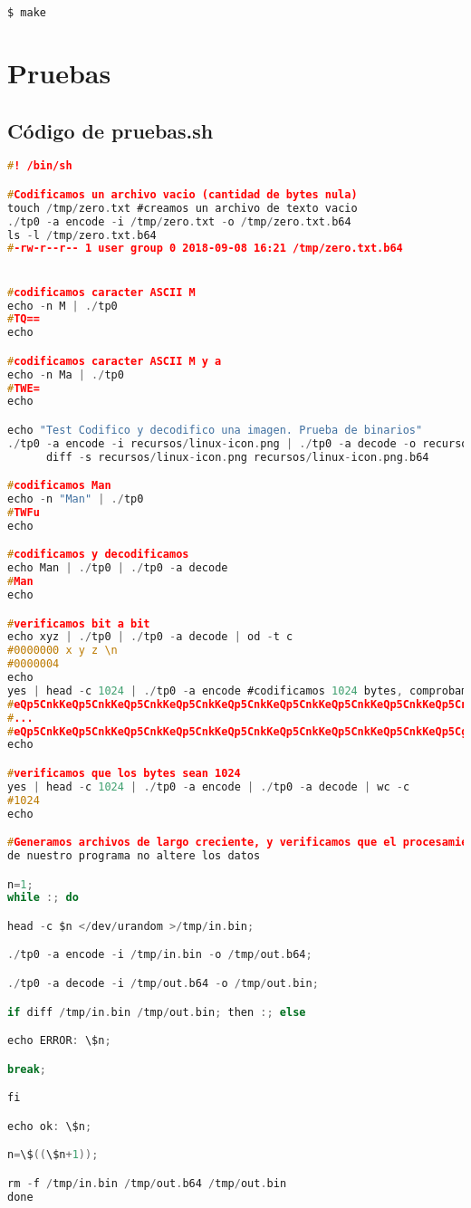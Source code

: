 \documentclass[a4paper,11pt, margin=1in]{article}
\begin{document}
\begin{lstlisting}[language=bash,frame=\tiny]
$ make
\end{lstlisting}

\section{Pruebas}
\subsection{Código de pruebas.sh}
\begin{lstlisting}[language=c,breaklines=true]
#! /bin/sh

#Codificamos un archivo vacio (cantidad de bytes nula)
touch /tmp/zero.txt #creamos un archivo de texto vacio
./tp0 -a encode -i /tmp/zero.txt -o /tmp/zero.txt.b64
ls -l /tmp/zero.txt.b64
#-rw-r--r-- 1 user group 0 2018-09-08 16:21 /tmp/zero.txt.b64


#codificamos caracter ASCII M
echo -n M | ./tp0 
#TQ==
echo

#codificamos caracter ASCII M y a
echo -n Ma | ./tp0 
#TWE=
echo

echo "Test Codifico y decodifico una imagen. Prueba de binarios"
./tp0 -a encode -i recursos/linux-icon.png | ./tp0 -a decode -o recursos/linux-icon.png.b64 &&
      diff -s recursos/linux-icon.png recursos/linux-icon.png.b64

#codificamos Man
echo -n "Man" | ./tp0 
#TWFu
echo

#codificamos y decodificamos
echo Man | ./tp0 | ./tp0 -a decode
#Man
echo

#verificamos bit a bit
echo xyz | ./tp0 | ./tp0 -a decode | od -t c
#0000000 x y z \n
#0000004
echo
yes | head -c 1024 | ./tp0 -a encode #codificamos 1024 bytes, comprobamos longitud
#eQp5CnkKeQp5CnkKeQp5CnkKeQp5CnkKeQp5CnkKeQp5CnkKeQp5CnkKeQp5CnkKeQp5CnkK
#...
#eQp5CnkKeQp5CnkKeQp5CnkKeQp5CnkKeQp5CnkKeQp5CnkKeQp5CnkKeQp5CnkKeQp5Cg==
echo

#verificamos que los bytes sean 1024
yes | head -c 1024 | ./tp0 -a encode | ./tp0 -a decode | wc -c 
#1024
echo

#Generamos archivos de largo creciente, y verificamos que el procesamiento
de nuestro programa no altere los datos

n=1;
while :; do

head -c $n </dev/urandom >/tmp/in.bin;

./tp0 -a encode -i /tmp/in.bin -o /tmp/out.b64;

./tp0 -a decode -i /tmp/out.b64 -o /tmp/out.bin;

if diff /tmp/in.bin /tmp/out.bin; then :; else

echo ERROR: \$n;

break;

fi

echo ok: \$n;

n=\$((\$n+1));

rm -f /tmp/in.bin /tmp/out.b64 /tmp/out.bin
done
\end{lstlisting}
\end{document}
